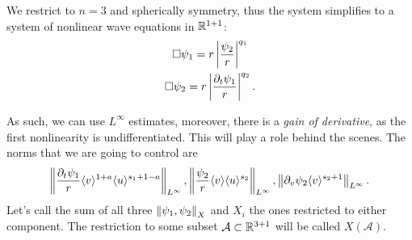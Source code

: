 \documentclass[11pt, oneside]{amsart}
\begin{document}
	We restrict to $n=3$ and spherically symmetry, thus the system simplifies to a system of nonlinear wave equations in $\mathbb{R}^{1+1}$:
	\begin{equation}\label{glassey strauss 1+1}
		\begin{gathered}
			\Box\psi_1=r\left\lvert \frac{\psi_2}{r}\right\rvert^{q_1}\\
			\Box\psi_2=r\left\lvert \frac{\partial_t\psi_1}{r}\right\rvert^{q_2}.
		\end{gathered}
	\end{equation}
	
	As such, we can use $L^\infty$ estimates, moreover, there is a  \textit{gain of derivative}, as the first nonlinearity is undifferentiated. This will play a role behind the scenes. The norms that we are going to control are
	\begin{equation*}
		\begin{gathered}
			\left\lVert \frac{\partial_t\psi_1}{r}\langle v \rangle^{1+a}\langle u \rangle^{s_1+1-a}\right\rVert_{L^\infty},\left\lVert \frac{\psi_2}{r}\langle v \rangle\langle u \rangle^{s_2}\right\rVert_{L^\infty},
			\left\lVert \partial_v\psi_2 \langle v \rangle^{s_2+1}\right\rVert_{L^\infty}.
		\end{gathered}
	\end{equation*}
	Let's call the sum of all three $\left\lVert \psi_1,\psi_2\right\rVert_X$ and $X_i$ the ones restricted to either component. The restriction to some subset $\mathcal{A}\subset\mathbb{R}^{3+1}$ will be called $X(\mathcal{A})$.
	
\end{document}
